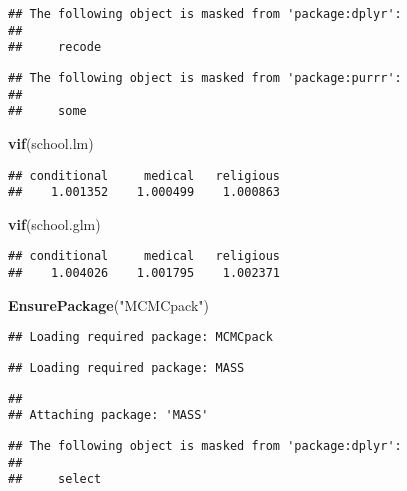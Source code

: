 \documentclass[]{article}
\newenvironment{Shaded}{\begin{snugshade}}{\end{snugshade}}
\newcommand{\KeywordTok}[1]{\textcolor[rgb]{0.13,0.29,0.53}{\textbf{#1}}}
\newcommand{\NormalTok}[1]{#1}
\newcommand{\StringTok}[1]{\textcolor[rgb]{0.31,0.60,0.02}{#1}}
\begin{document}
\begin{verbatim}
## The following object is masked from 'package:dplyr':
## 
##     recode
\end{verbatim}

\begin{verbatim}
## The following object is masked from 'package:purrr':
## 
##     some
\end{verbatim}

\begin{Shaded}
\begin{Highlighting}[]
\KeywordTok{vif}\NormalTok{(school.lm)}
\end{Highlighting}
\end{Shaded}

\begin{verbatim}
## conditional     medical   religious 
##    1.001352    1.000499    1.000863
\end{verbatim}

\begin{Shaded}
\begin{Highlighting}[]
\KeywordTok{vif}\NormalTok{(school.glm)}
\end{Highlighting}
\end{Shaded}

\begin{verbatim}
## conditional     medical   religious 
##    1.004026    1.001795    1.002371
\end{verbatim}

\begin{Shaded}
\begin{Highlighting}[]
\KeywordTok{EnsurePackage}\NormalTok{(}\StringTok{"MCMCpack"}\NormalTok{)}
\end{Highlighting}
\end{Shaded}

\begin{verbatim}
## Loading required package: MCMCpack
\end{verbatim}

\begin{verbatim}
## Loading required package: MASS
\end{verbatim}

\begin{verbatim}
## 
## Attaching package: 'MASS'
\end{verbatim}

\begin{verbatim}
## The following object is masked from 'package:dplyr':
## 
##     select
\end{verbatim}
\end{document}
